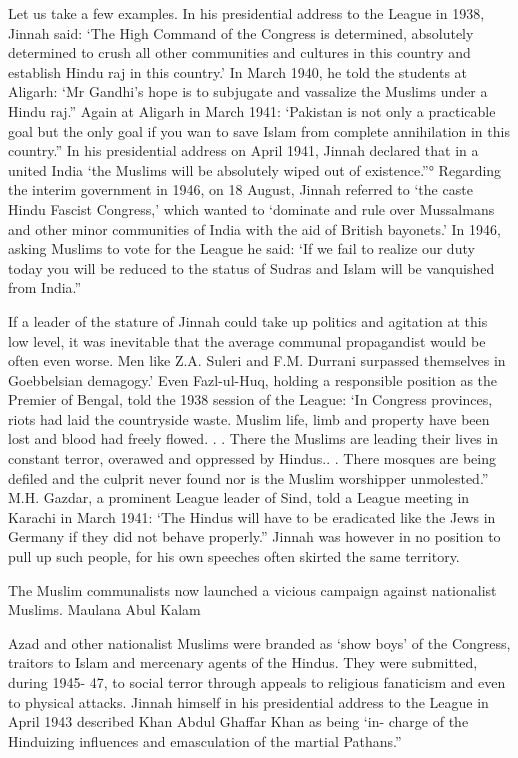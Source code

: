 Let us take a few examples. In his presidential address to the League in 1938, Jinnah said: ‘The High Command of the Congress is determined, absolutely determined to crush all other communities and cultures in this country and establish Hindu raj in this country.’ In March 1940, he told the students at Aligarh: ‘Mr Gandhi’s hope is to subjugate and vassalize the Muslims under a Hindu raj.” Again at Aligarh in March 1941: ‘Pakistan is not only a practicable goal but the only goal if you wan to save Islam from complete annihilation in this country.” In his presidential address on April 1941, Jinnah declared that in a united India ‘the Muslims will be absolutely wiped out of existence.”° Regarding the interim government in 1946, on 18 August, Jinnah referred to ‘the caste Hindu Fascist Congress,’ which wanted to ‘dominate and rule over Mussalmans and other minor communities of India with the aid of British bayonets.’ In 1946, asking Muslims to vote for the League he said: ‘If we fail to realize our duty today you will be reduced to the status of Sudras and Islam will be vanquished from India.” 

If a leader of the stature of Jinnah could take up politics and agitation at this low level, it was inevitable that the average communal propagandist would be often even worse. Men like Z.A. Suleri and F.M. Durrani surpassed themselves in Goebbelsian demagogy.’ Even Fazl-ul-Huq, holding a responsible position as the Premier of Bengal, told the 1938 session of the League: ‘In Congress provinces, riots had laid the countryside waste. Muslim life, limb and property have been lost and blood had freely flowed. . . There the Muslims are leading their lives in constant terror, overawed and oppressed by Hindus.. . There mosques are being defiled and the culprit never found nor is the Muslim worshipper unmolested.” M.H. Gazdar, a prominent League leader of Sind, told a League meeting in Karachi in March 1941: ‘The Hindus will have to be eradicated like the Jews in Germany if they did not behave properly.” Jinnah was however in no position to pull up such people, for his own speeches often skirted the same territory. 

The Muslim communalists now launched a vicious campaign against nationalist Muslims. Maulana Abul Kalam 

Azad and other nationalist Muslims were branded as ‘show boys’ of the Congress, traitors to Islam and mercenary agents of the Hindus. They were submitted, during 1945- 47, to social terror through appeals to religious fanaticism and even to physical attacks. Jinnah himself in his presidential address to the League in April 1943 described Khan Abdul Ghaffar Khan as being ‘in- charge of the Hinduizing influences and emasculation of the martial Pathans.” 

